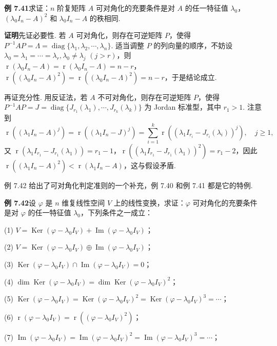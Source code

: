 \documentclass[UTF8, 12pt, fontset=fandol, oneside]{ctexart}
\begin{document}
\noindent\textbf{例 7.41}\quad 求证：$n$ 阶复矩阵 $A$ 可对角化的充要条件是对 $A$ 的任一特征值 $\lambda_0$，$(\lambda_0I_n-A)^2$ 和 $\lambda_0I_n-A$ 的秩相同.

\noindent\textbf{证明}\quad 先证必要性. 若 $A$ 可对角化，则存在可逆矩阵 $P$，使得 $P^{-1}AP=\Lambda=\operatorname{diag}\{\lambda_1,\lambda_2,\cdots,\lambda_n\}$. 适当调整 $P$ 的列向量的顺序，不妨设 $\lambda_0=\lambda_1=\cdots=\lambda_r,\lambda_0\ne\lambda_j$ $(j>r)$，则 $\operatorname{r}(\lambda_0I_n-A)=\operatorname{r}(\lambda_0I_n-\Lambda)=n-r$，$\operatorname{r}((\lambda_0I_n-A)^2)=\operatorname{r}((\lambda_0I_n-\Lambda)^2)=n-r$，于是结论成立.

再证充分性. 用反证法，若 $A$ 不可对角化，则存在可逆矩阵 $P$，使得 $P^{-1}AP=J=\operatorname{diag}\{J_{r_1}(\lambda_1),\cdots,J_{r_k}(\lambda_k)\}$ 为 Jordan 标准型，其中 $r_1>1$. 注意到
\[
\operatorname{r}((\lambda_1I_n-A)^j)=\operatorname{r}((\lambda_1I_n-J)^j)
=\sum_{i=1}^k\operatorname{r}((\lambda_1I_{r_i}-J_{r_i}(\lambda_i))^j),\quad j\ge 1,
\]
又 $\operatorname{r}(\lambda_1I_{r_1}-J_{r_1}(\lambda_1))=r_1-1$，$\operatorname{r}((\lambda_1I_{r_1}-J_{r_1}(\lambda_1))^2)=r_1-2$，因此 $\operatorname{r}((\lambda_1I_n-A)^2)<\operatorname{r}(\lambda_1I_n-A)$，这与假设矛盾.

例 7.42 给出了可对角化判定准则的一个补充，例 7.40 和例 7.41 都是它的特例.

\noindent\textbf{例 7.42}\quad 设 $\varphi$ 是 $n$ 维复线性空间 $V$ 上的线性变换，求证：$\varphi$ 可对角化的充要条件是对 $\varphi$ 的任一特征值 $\lambda_0$，下列条件之一成立：

(1) $V=\operatorname{Ker}(\varphi-\lambda_0I_V)+\operatorname{Im}(\varphi-\lambda_0I_V)$；

(2) $V=\operatorname{Ker}(\varphi-\lambda_0I_V)\oplus\operatorname{Im}(\varphi-\lambda_0I_V)$；

(3) $\operatorname{Ker}(\varphi-\lambda_0I_V)\cap\operatorname{Im}(\varphi-\lambda_0I_V)=0$；

(4) $\dim\operatorname{Ker}(\varphi-\lambda_0I_V)=\dim\operatorname{Ker}(\varphi-\lambda_0I_V)^2$；

(5) $\operatorname{Ker}(\varphi-\lambda_0I_V)=\operatorname{Ker}(\varphi-\lambda_0I_V)^2=\operatorname{Ker}(\varphi-\lambda_0I_V)^3=\cdots$；

(6) $\operatorname{r}(\varphi-\lambda_0I_V)=\operatorname{r}((\varphi-\lambda_0I_V)^2)$；

(7) $\operatorname{Im}(\varphi-\lambda_0I_V)=\operatorname{Im}(\varphi-\lambda_0I_V)^2=\operatorname{Im}(\varphi-\lambda_0I_V)^3=\cdots$；
\end{document}
